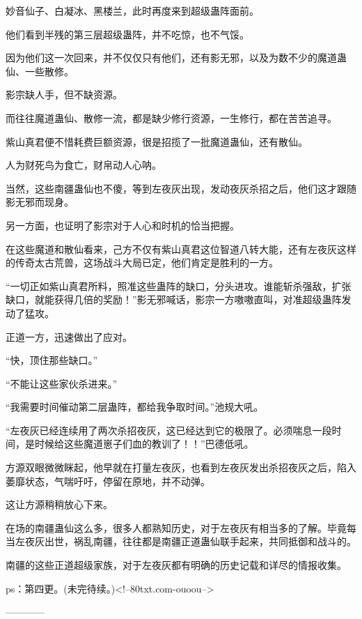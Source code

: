 \begin{this_body}
妙音仙子、白凝冰、黑楼兰，此时再度来到超级蛊阵面前。

他们看到半残的第三层超级蛊阵，并不吃惊，也不气馁。

因为他们这一次回来，并不仅仅只有他们，还有影无邪，以及为数不少的魔道蛊仙、一些散修。

影宗缺人手，但不缺资源。

而往往魔道蛊仙、散修一流，都是缺少修行资源，一生修行，都在苦苦追寻。

紫山真君便不惜耗费巨额资源，很是招揽了一批魔道蛊仙，还有散仙。

人为财死鸟为食亡，财帛动人心呐。

当然，这些南疆蛊仙也不傻，等到左夜灰出现，发动夜灰杀招之后，他们这才跟随影无邪而现身。

另一方面，也证明了影宗对于人心和时机的恰当把握。

在这些魔道和散仙看来，己方不仅有紫山真君这位智道八转大能，还有左夜灰这样的传奇太古荒兽，这场战斗大局已定，他们肯定是胜利的一方。

“一切正如紫山真君所料，照准这些蛊阵的缺口，分头进攻。谁能斩杀强敌，扩张缺口，就能获得几倍的奖励！”影无邪喊话，影宗一方嗷嗷直叫，对准超级蛊阵发动了猛攻。

正道一方，迅速做出了应对。

“快，顶住那些缺口。”

“不能让这些家伙杀进来。”

“我需要时间催动第二层蛊阵，都给我争取时间。”池规大吼。

“左夜灰已经连续用了两次杀招夜灰，这已经达到它的极限了。必须喘息一段时间，是时候给这些魔道崽子们血的教训了！！”巴德低吼。

方源双眼微微眯起，他早就在打量左夜灰，也看到左夜灰发出杀招夜灰之后，陷入萎靡状态，气喘吁吁，停留在原地，并不动弹。

这让方源稍稍放心下来。

在场的南疆蛊仙这么多，很多人都熟知历史，对于左夜灰有相当多的了解。毕竟每当左夜灰出世，祸乱南疆，往往都是南疆正道蛊仙联手起来，共同抵御和战斗的。

南疆的这些正道超级家族，对于左夜灰都有明确的历史记载和详尽的情报收集。

ps：第四更。(未完待续。)<!--80txt.com-ouoou-->

------------

\end{this_body}

